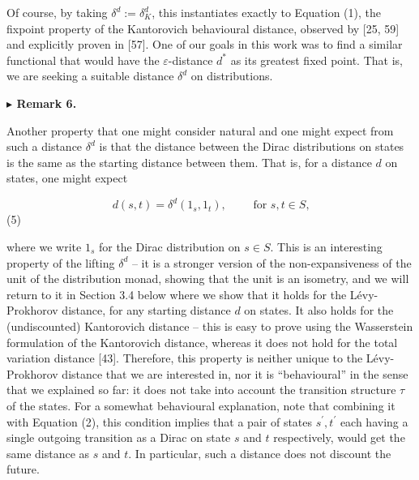 \documentclass[10pt,a4paper]{article}
\begin{document}
Of course, by taking $\delta^{d}:=\delta_{K}^{d}$, this instantiates exactly to Equation (1), the fixpoint property of the Kantorovich behavioural distance, observed by [25, 59] and explicitly proven in [57]. One of our goals in this work was to find a similar functional that would have the $\varepsilon$-distance $d^{*}$ as its greatest fixed point. That is, we are seeking a suitable distance $\delta^{d}$ on distributions.\par
 
 
 
\par\medskip\noindent\textbf{$\blacktriangleright$ Remark 6.}\par
 
 
Another property that one might consider natural and one might expect from such a distance $\delta^{d}$ is that the distance between the Dirac distributions on states is the same as the starting distance between them. That is, for a distance $d$ on states, one might expect\par
  
\par  \quad  \[d(s,t)=\delta^{d}(1_{s},1_{t}),\qquad\mbox{ for $s,t\in S$,}\]\quad  \quad  (5)\quad  
  
where we write $1_{s}$ for the Dirac distribution on $s\in S$. This is an interesting property of the lifting $\delta^{d}$ – it is a stronger version of the non-expansiveness of the unit of the distribution monad, showing that the unit is an isometry, and we will return to it in Section 3.4 below where we show that it holds for the Lévy-Prokhorov distance, for any starting distance $d$ on states. It also holds for the (undiscounted) Kantorovich distance – this is easy to prove using the Wasserstein formulation of the Kantorovich distance, whereas it does not hold for the total variation distance [43]. Therefore, this property is neither unique to the Lévy-Prokhorov distance that we are interested in, nor it is “behavioural” in the sense that we explained so far: it does not take into account the transition structure $\tau$ of the states. For a somewhat behavioural explanation, note that combining it with Equation (2), this condition implies that a pair of states $s^{\prime},t^{\prime}$ each having a single outgoing transition as a Dirac on state $s$ and $t$ respectively, would get the same distance as $s$ and $t$. In particular, such a distance does not discount the future.\par
 
\end{document}
